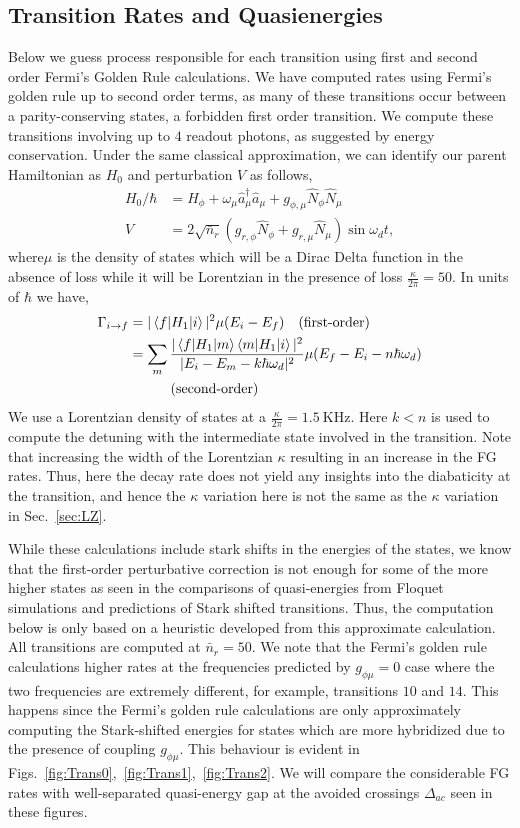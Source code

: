 \documentclass[%
reprint,
superscriptaddress,
 amsmath,amssymb,
 aps,
 prx,
longbibliography,
floatfix,
]{revtex4-2}
\begin{document}
\subsection{Transition Rates and Quasienergies}\label{app:Floquet-trans}
Below we guess process responsible for each transition using first and second order Fermi's Golden Rule calculations. We have computed rates using Fermi's golden rule up to second order terms, as many of these transitions occur between a parity-conserving states, a forbidden first order transition. We compute these transitions involving up to $4$ readout photons, as suggested by energy conservation. 
Under the same classical approximation, we can identify our parent Hamiltonian as $H_0$ and perturbation $V$ as follows,
\begin{align}
H_0/\hbar&=H_{\phi}+\omega_\mu \hat a_\mu^\dagger \hat a_\mu+g_{\phi,\mu}\hat N_\phi \hat N_\mu\\
V&=2\sqrt{\bar n_r}(g_{r,\phi} \hat N_\phi+g_{r,\mu}\hat N_\mu)\sin{\omega_d t},
\end{align}
where$\mu$ is the density of states which will be a Dirac Delta function in the absence of loss while it will be Lorentzian in the presence of loss $\frac{\kappa}{2\pi}=50$. In units of $\hbar$ we have,
\begin{align}
    \Gamma_{i\rightarrow f}&=|\braket{f|H_1|i}|^2\mu(E_i-E_f)\quad\textrm{(first-order)}\\
&=\sum_m\frac{|\braket{f|H_1|m}\braket{m|H_1|i}|^2}{|E_i-E_m-k\hbar\omega_d|^2}\mu(E_f-E_i-n\hbar \omega_d)\nonumber\\&\quad\quad\quad\textrm{(second-order)}
\end{align}
We use a Lorentzian density of states at a $\frac{\kappa}{2\pi}=1.5 \ \mathrm{KHz}$. Here $k<n$ is used to compute the detuning with the intermediate state involved in the transition. Note that increasing the width of the Lorentzian $\kappa$ resulting in an increase in the FG rates. Thus, here the decay rate does not yield any insights into the diabaticity at the transition, and hence the $\kappa$ variation here is not the same as the $\kappa$ variation in Sec.~\ref{sec:LZ}.

While these calculations include stark shifts in the energies of the states, we know that the first-order perturbative correction is not enough for some of the more higher states as seen in the comparisons of quasi-energies from Floquet simulations and predictions of Stark shifted transitions. Thus, the computation below is only based on a heuristic developed from this approximate calculation. All transitions are computed at $\bar n_r=50$. We note that the Fermi's golden rule calculations higher rates at the frequencies predicted by $g_{\phi\mu}=0$ case where the two frequencies are extremely different, for example, transitions $10$ and $14$. This happens since the Fermi's golden rule calculations are only approximately computing the Stark-shifted energies for states which are more hybridized due to the presence of coupling $g_{\phi\mu}$. This behaviour is evident in Figs.~\ref{fig:Trans0},~\ref{fig:Trans1},~\ref{fig:Trans2}. We will compare the considerable FG rates with well-separated quasi-energy gap at the avoided crossings  $\Delta_{ac}$ seen in these figures.
\end{document}
